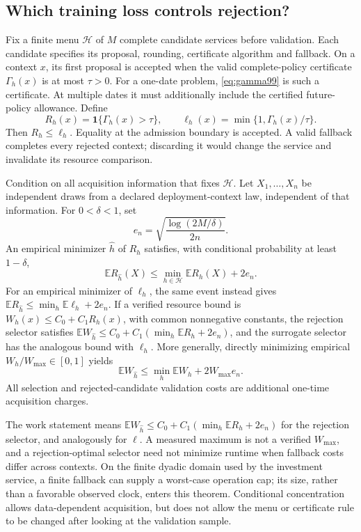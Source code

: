 \subsection{Which training loss controls rejection?}
Fix a finite menu $\mathcal H$ of $M$ complete candidate services before validation. Each candidate specifies its proposal, rounding, certificate algorithm and fallback. On a context $x$, its first proposal is accepted when the valid complete-policy certificate $\Gamma_h(x)$ is at most $\tau>0$. For a one-date problem, \eqref{eq:gamma99} is such a certificate. At multiple dates it must additionally include the certified future-policy allowance. Define
\begin{equation}\label{eq:loss99}
 R_h(x)=\boldsymbol 1\{\Gamma_h(x)>\tau\},\qquad
 \ell_h(x)=\min\{1,\Gamma_h(x)/\tau\}.
\end{equation}
Then $R_h\le\ell_h$. Equality at the admission boundary is accepted. A valid fallback completes every rejected context; discarding it would change the service and invalidate its resource comparison.

\begin{theorem}\label{thm:selection99}
Condition on all acquisition information that fixes $\mathcal H$. Let $X_1,\ldots,X_n$ be independent draws from a declared deployment-context law, independent of that information. For $0<\delta<1$, set
\[
 e_n=\sqrt{\frac{\log(2M/\delta)}{2n}}.
\]
An empirical minimizer $\widehat h$ of $R_h$ satisfies, with conditional probability at least $1-\delta$,
\begin{equation}\label{eq:rejection99}
 \mathbb E R_{\widehat h}(X)\le\min_{h\in\mathcal H}\mathbb E R_h(X)+2e_n.
\end{equation}
For an empirical minimizer of $\ell_h$, the same event instead gives
$\mathbb E R_{\widehat h}\le\min_h\mathbb E\ell_h+2e_n$.
If a verified resource bound is $W_h(x)\le C_0+C_1R_h(x)$, with common nonnegative constants, the rejection selector satisfies $\mathbb E W_{\widehat h}\le C_0+C_1(\min_h\mathbb E R_h+2e_n)$, and the surrogate selector has the analogous bound with $\ell_h$. More generally, directly minimizing empirical $W_h/W_{\max}\in[0,1]$ yields
\[
 \mathbb E W_{\widehat h}\le\min_h\mathbb E W_h+2W_{\max}e_n.
\]
All selection and rejected-candidate validation costs are additional one-time acquisition charges.
\end{theorem}

The work statement means $\mathbb E W_{\widehat h}\le C_0+C_1(\min_h\mathbb E R_h+2e_n)$ for the rejection selector, and analogously for $\ell$. A measured maximum is not a verified $W_{\max}$, and a rejection-optimal selector need not minimize runtime when fallback costs differ across contexts. On the finite dyadic domain used by the investment service, a finite fallback can supply a worst-case operation cap; its size, rather than a favorable observed clock, enters this theorem. Conditional concentration allows data-dependent acquisition, but does not allow the menu or certificate rule to be changed after looking at the validation sample.


